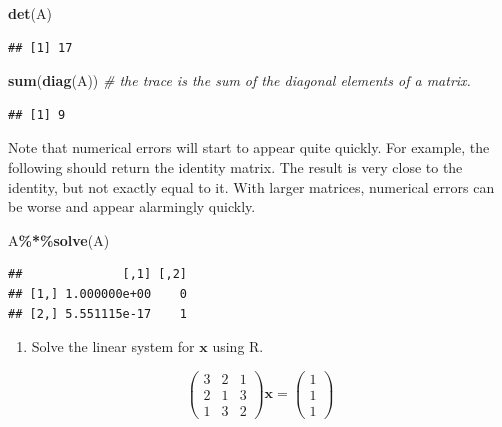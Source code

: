 \documentclass[
]{book}
\newenvironment{Shaded}{\begin{snugshade}}{\end{snugshade}}
\newcommand{\CommentTok}[1]{\textcolor[rgb]{0.56,0.35,0.01}{\textit{#1}}}
\newcommand{\FunctionTok}[1]{\textcolor[rgb]{0.13,0.29,0.53}{\textbf{#1}}}
\newcommand{\NormalTok}[1]{#1}
\newcommand{\SpecialCharTok}[1]{\textcolor[rgb]{0.81,0.36,0.00}{\textbf{#1}}}
\providecommand{\tightlist}{%
  \setlength{\itemsep}{0pt}\setlength{\parskip}{0pt}}
\theoremstyle{definition}
\theoremstyle{definition}
\theoremstyle{definition}
\theoremstyle{definition}
\theoremstyle{remark}
\begin{document}
\begin{Shaded}
\begin{Highlighting}[]
\FunctionTok{det}\NormalTok{(A)}
\end{Highlighting}
\end{Shaded}

\begin{verbatim}
## [1] 17
\end{verbatim}

\begin{Shaded}
\begin{Highlighting}[]
\FunctionTok{sum}\NormalTok{(}\FunctionTok{diag}\NormalTok{(A)) }\CommentTok{\# the trace is the sum of the diagonal elements of a matrix.}
\end{Highlighting}
\end{Shaded}

\begin{verbatim}
## [1] 9
\end{verbatim}

Note that numerical errors will start to appear quite quickly. For example, the following should return the identity matrix. The result is very close to the identity, but not exactly equal to it. With larger matrices, numerical errors can be worse and appear alarmingly quickly.

\begin{Shaded}
\begin{Highlighting}[]
\NormalTok{A}\SpecialCharTok{\%*\%}\FunctionTok{solve}\NormalTok{(A)}
\end{Highlighting}
\end{Shaded}

\begin{verbatim}
##              [,1] [,2]
## [1,] 1.000000e+00    0
## [2,] 5.551115e-17    1
\end{verbatim}

\begin{enumerate}
\def\labelenumi{\arabic{enumi}.}
\tightlist
\item
  Solve the linear system for \(\mathbf x\) using R.
\end{enumerate}

\[\left(\begin{array}{ccc} 3&2&1\\2&1&3\\ 1&3&2\end{array}\right) \mathbf x=\left(\begin{array}{c} 1\\1\\ 1\end{array}\right)\]
\end{document}
